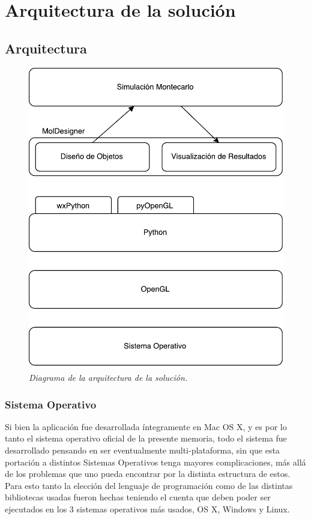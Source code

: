 \chapter{Arquitectura de la solución}
\label{cap:arquitectura}

\section{Arquitectura}

\begin{figure}[H]
  \centering
  \includegraphics[scale=.7]{images/arquitectura}
  \caption{\em Diagrama de la arquitectura de la solución.}
\end{figure}

\subsection{Sistema Operativo}

Si bien la aplicación fue desarrollada íntegramente en Mac OS X, y es por lo tanto el sistema operativo oficial de la presente memoria, todo el sistema fue desarrollado pensando en ser eventualmente multi-plataforma, sin que esta portación a distintos Sistemas Operativos tenga mayores complicaciones, más allá de los problemas que uno pueda encontrar por la distinta estructura de estos. Para esto tanto la elección del lenguaje de programación como de las distintas bibliotecas usadas fueron hechas teniendo el cuenta que deben poder ser ejecutados en los 3 sistemas operativos más usados, OS X, Windows y Linux.

